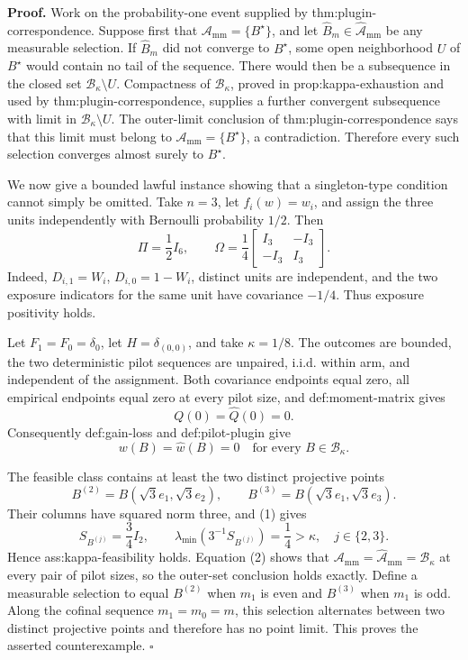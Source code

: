\textbf{Proof.}
Work on the probability-one event supplied by thm:plugin-correspondence.  Suppose first that \(\mathcal A_{\mathrm{mm}}=\{B^\star\}\), and let \(\widehat B_m\in\widehat{\mathcal A}_{\mathrm{mm}}\) be any measurable selection.  If \(\widehat B_m\) did not converge to \(B^\star\), some open neighborhood \(U\) of \(B^\star\) would contain no tail of the sequence.  There would then be a subsequence in the closed set \(\mathcal B_\kappa\setminus U\).  Compactness of \(\mathcal B_\kappa\), proved in prop:kappa-exhaustion and used by thm:plugin-correspondence, supplies a further convergent subsequence with limit in \(\mathcal B_\kappa\setminus U\).  The outer-limit conclusion of thm:plugin-correspondence says that this limit must belong to \(\mathcal A_{\mathrm{mm}}=\{B^\star\}\), a contradiction.  Therefore every such selection converges almost surely to \(B^\star\).

We now give a bounded lawful instance showing that a singleton-type condition cannot simply be omitted.  Take \(n=3\), let \(f_i(w)=w_i\), and assign the three units independently with Bernoulli probability \(1/2\).  Then
\[
 \Pi=\frac12I_6,
 \qquad
 \Omega=\frac14
 \begin{bmatrix}
 I_3&-I_3\\
 -I_3&I_3
 \end{bmatrix}.
 \tag{1}
\]
Indeed, \(D_{i,1}=W_i\), \(D_{i,0}=1-W_i\), distinct units are independent, and the two exposure indicators for the same unit have covariance \(-1/4\).  Thus exposure positivity holds.

Let \(F_1=F_0=\delta_0\), let \(H=\delta_{(0,0)}\), and take \(\kappa=1/8\).  The outcomes are bounded, the two deterministic pilot sequences are unpaired, i.i.d. within arm, and independent of the assignment.  Both covariance endpoints equal zero, all empirical endpoints equal zero at every pilot size, and def:moment-matrix gives
\[
 Q(0)=\widehat Q(0)=0.
\]
Consequently def:gain-loss and def:pilot-plugin give
\[
 w(B)=\widehat w(B)=0
 \quad\text{for every }B\in\mathcal B_\kappa.
 \tag{2}
\]

The feasible class contains at least the two distinct projective points
\[
 B^{(2)}=B(\sqrt3e_1,\sqrt3e_2),
 \qquad
 B^{(3)}=B(\sqrt3e_1,\sqrt3e_3).
\]
Their columns have squared norm three, and (1) gives
\[
 S_{B^{(j)}}=\frac34I_2,
 \qquad
 \lambda_{\min}\!\left(3^{-1}S_{B^{(j)}}\right)=\frac14>\kappa,
 \quad j\in\{2,3\}.
 \tag{3}
\]
Hence ass:kappa-feasibility holds.  Equation (2) shows that
\(\mathcal A_{\mathrm{mm}}=\widehat{\mathcal A}_{\mathrm{mm}}=\mathcal B_\kappa\) at every pair of pilot sizes, so the outer-set conclusion holds exactly.  Define a measurable selection to equal \(B^{(2)}\) when \(m_1\) is even and \(B^{(3)}\) when \(m_1\) is odd.  Along the cofinal sequence \(m_1=m_0=m\), this selection alternates between two distinct projective points and therefore has no point limit.  This proves the asserted counterexample. \(\square\)